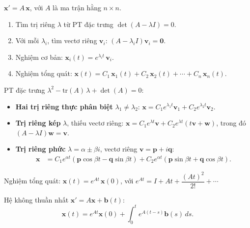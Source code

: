 \documentclass[12pt,a4paper]{article}
\begin{document}
\begin{dinhnghia}
  $\mathbf{x}' = A\,\mathbf{x}$, với $A$ là ma trận hằng $n \times n$.
\end{dinhnghia}

\begin{phuongphap}[title={Phương pháp trị riêng}]
  \begin{enumerate}
    \item Tìm trị riêng $\lambda$ từ PT đặc trưng $\det(A - \lambda I) = 0$.
    \item Với mỗi $\lambda_i$, tìm vectơ riêng $\mathbf{v}_i$: $(A - \lambda_i I)\mathbf{v}_i = \mathbf{0}$.
    \item Nghiệm cơ bản: $\mathbf{x}_i(t) = e^{\lambda_i t}\,\mathbf{v}_i$.
    \item Nghiệm tổng quát: $\mathbf{x}(t) = C_1\,\mathbf{x}_1(t) + C_2\,\mathbf{x}_2(t) + \cdots + C_n\,\mathbf{x}_n(t)$.
  \end{enumerate}
\end{phuongphap}

\begin{congthuc}[title={Các trường hợp (hệ $2 \times 2$)}]
  PT đặc trưng $\lambda^2 - \text{tr}(A)\,\lambda + \det(A) = 0$:
  \begin{itemize}
    \item \textbf{Hai trị riêng thực phân biệt} $\lambda_1 \ne \lambda_2$:
      $\mathbf{x} = C_1 e^{\lambda_1 t}\mathbf{v}_1 + C_2 e^{\lambda_2 t}\mathbf{v}_2$.
    \item \textbf{Trị riêng kép} $\lambda$, thiếu vectơ riêng:
      $\mathbf{x} = C_1 e^{\lambda t}\mathbf{v} + C_2 e^{\lambda t}(t\mathbf{v} + \mathbf{w})$, trong đó $(A - \lambda I)\mathbf{w} = \mathbf{v}$.
    \item \textbf{Trị riêng phức} $\lambda = \alpha \pm \beta i$, vectơ riêng $\mathbf{v} = \mathbf{p} + i\mathbf{q}$:
      \begin{align*}
        \mathbf{x} &= C_1 e^{\alpha t}(\mathbf{p}\cos\beta t - \mathbf{q}\sin\beta t) + C_2 e^{\alpha t}(\mathbf{p}\sin\beta t + \mathbf{q}\cos\beta t).
      \end{align*}
  \end{itemize}
\end{congthuc}

\begin{phuongphap}[title={Ma trận mũ}]
  Nghiệm tổng quát: $\mathbf{x}(t) = e^{At}\,\mathbf{x}(0)$, với $e^{At} = I + At + \dfrac{(At)^2}{2!} + \cdots$

  Hệ không thuần nhất $\mathbf{x}' = A\mathbf{x} + \mathbf{b}(t)$:
  \[
    \mathbf{x}(t) = e^{At}\mathbf{x}(0) + \int_0^t e^{A(t-s)}\mathbf{b}(s)\,ds.
  \]
\end{phuongphap}
\end{document}
